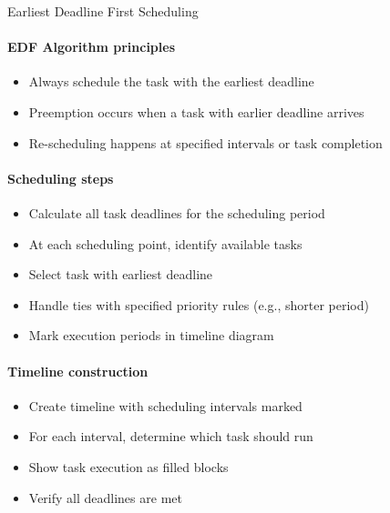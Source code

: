 \begin{minipage}{0.53\linewidth}
\begin{KR}{Earliest Deadline First Scheduling}
    \paragraph{EDF Algorithm principles}
    \begin{itemize}
        \item Always schedule the task with the earliest deadline
        \item Preemption occurs when a task with earlier deadline arrives
        \item Re-scheduling happens at specified intervals or task completion
    \end{itemize}
    
    \paragraph{Scheduling steps}
    \begin{itemize}
        \item Calculate all task deadlines for the scheduling period
        \item At each scheduling point, identify available tasks
        \item Select task with earliest deadline
        \item Handle ties with specified priority rules (e.g., shorter period)
        \item Mark execution periods in timeline diagram
    \end{itemize}
    
    \paragraph{Timeline construction}
    \begin{itemize}
        \item Create timeline with scheduling intervals marked
        \item For each interval, determine which task should run
        \item Show task execution as filled blocks
        \item Verify all deadlines are met
    \end{itemize}
\end{KR}
\end{minipage}
